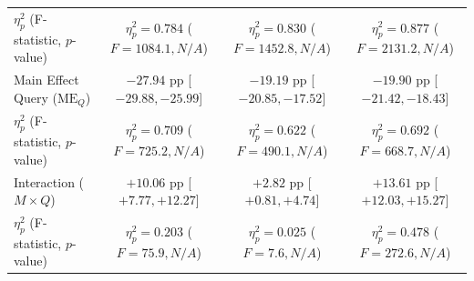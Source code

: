 \begin{table}[!htbp]
{\begin{tabular}{lccc}
$\eta_p^2$ (F-statistic, $p$-value) & $\eta_p^2 = 0.784$ ($F=1084.1, N/A$) & $\eta_p^2 = 0.830$ ($F=1452.8, N/A$) & $\eta_p^2 = 0.877$ ($F=2131.2, N/A$) \\
Main Effect Query ($\text{ME}_Q$) & $-27.94$ pp [$-29.88, -25.99$] & $-19.19$ pp [$-20.85, -17.52$] & $-19.90$ pp [$-21.42, -18.43$] \\
$\eta_p^2$ (F-statistic, $p$-value) & $\eta_p^2 = 0.709$ ($F=725.2, N/A$) & $\eta_p^2 = 0.622$ ($F=490.1, N/A$) & $\eta_p^2 = 0.692$ ($F=668.7, N/A$) \\
Interaction ($M \times Q$) & $+10.06$ pp [$+7.77, +12.27$] & $+2.82$ pp [$+0.81, +4.74$] & $+13.61$ pp [$+12.03, +15.27$] \\
$\eta_p^2$ (F-statistic, $p$-value) & $\eta_p^2 = 0.203$ ($F=75.9, N/A$) & $\eta_p^2 = 0.025$ ($F=7.6, N/A$) & $\eta_p^2 = 0.478$ ($F=272.6, N/A$) \\
\bottomrule
\end{tabular}%
}
\end{table}